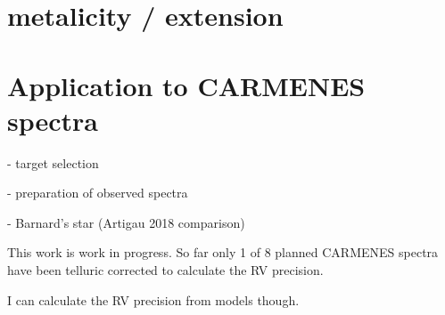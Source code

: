 \section{ metalicity / \logg{} extension}



\section{Application to {CARMENES} spectra}

- target selection

- preparation of observed spectra

- Barnard's star (Artigau 2018 comparison)


This work is work in progress.
So far only 1 of 8 planned {CARMENES} spectra have been telluric corrected to calculate the {RV} precision.

{I can calculate the {RV} precision from models though.}
